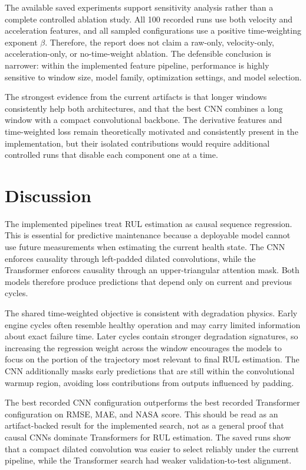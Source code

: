 \documentclass[11pt,a4paper]{article}
\begin{document}
The available saved experiments support sensitivity analysis rather than a complete controlled ablation study. All 100 recorded runs use both velocity and acceleration features, and all sampled configurations use a positive time-weighting exponent $\beta$. Therefore, the report does not claim a raw-only, velocity-only, acceleration-only, or no-time-weight ablation. The defensible conclusion is narrower: within the implemented feature pipeline, performance is highly sensitive to window size, model family, optimization settings, and model selection.

The strongest evidence from the current artifacts is that longer windows consistently help both architectures, and that the best CNN combines a long window with a compact convolutional backbone. The derivative features and time-weighted loss remain theoretically motivated and consistently present in the implementation, but their isolated contributions would require additional controlled runs that disable each component one at a time.

\section{Discussion}

The implemented pipelines treat RUL estimation as causal sequence regression. This is essential for predictive maintenance because a deployable model cannot use future measurements when estimating the current health state. The CNN enforces causality through left-padded dilated convolutions, while the Transformer enforces causality through an upper-triangular attention mask. Both models therefore produce predictions that depend only on current and previous cycles.

The shared time-weighted objective is consistent with degradation physics. Early engine cycles often resemble healthy operation and may carry limited information about exact failure time. Later cycles contain stronger degradation signatures, so increasing the regression weight across the window encourages the models to focus on the portion of the trajectory most relevant to final RUL estimation. The CNN additionally masks early predictions that are still within the convolutional warmup region, avoiding loss contributions from outputs influenced by padding.

The best recorded CNN configuration outperforms the best recorded Transformer configuration on RMSE, MAE, and NASA score. This should be read as an artifact-backed result for the implemented search, not as a general proof that causal CNNs dominate Transformers for RUL estimation. The saved runs show that a compact dilated convolution was easier to select reliably under the current pipeline, while the Transformer search had weaker validation-to-test alignment.
\end{document}
